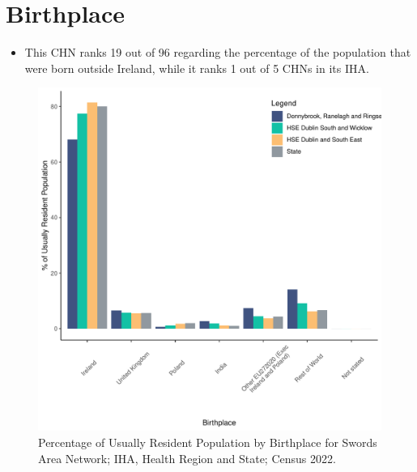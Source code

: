 \documentclass{article}
\begin{document}
\section{Birthplace}\label{sect:Birth}
\begin{itemize}
\item This CHN ranks  19 out of 96 regarding the percentage of the population that were born outside Ireland, while it ranks  1 out of 5 CHNs in its IHA.
\end{itemize}
\begin{figure}[H]
	\centering
	\includegraphics[width = 130mm]{../figures/BirthED.pdf}
	\caption{Percentage of Usually Resident Population by Birthplace for Swords Area Network; IHA, Health Region and State; Census 2022.}
	\label{fig:vbnv}
	\end{figure}
	
\end{document}
